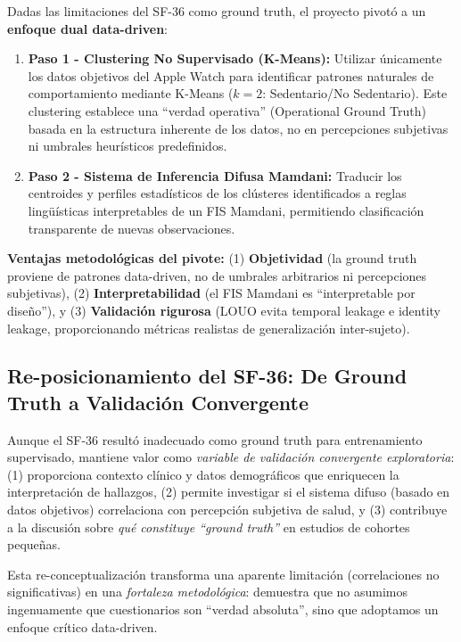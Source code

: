 Dadas las limitaciones del SF-36 como ground truth, el proyecto pivotó a un \textbf{enfoque dual data-driven}:

\begin{enumerate}
    \item \textbf{Paso 1 - Clustering No Supervisado (K-Means):} Utilizar únicamente los datos objetivos del Apple Watch para identificar patrones naturales de comportamiento mediante K-Means ($k=2$: Sedentario/No Sedentario). Este clustering establece una ``verdad operativa'' (Operational Ground Truth) basada en la estructura inherente de los datos, no en percepciones subjetivas ni umbrales heurísticos predefinidos.
    
    \item \textbf{Paso 2 - Sistema de Inferencia Difusa Mamdani:} Traducir los centroides y perfiles estadísticos de los clústeres identificados a reglas lingüísticas interpretables de un FIS Mamdani, permitiendo clasificación transparente de nuevas observaciones.
\end{enumerate}

\textbf{Ventajas metodológicas del pivote:} (1) \textbf{Objetividad} (la ground truth proviene de patrones data-driven, no de umbrales arbitrarios ni percepciones subjetivas), (2) \textbf{Interpretabilidad} (el FIS Mamdani es ``interpretable por diseño''), y (3) \textbf{Validación rigurosa} (LOUO evita temporal leakage e identity leakage, proporcionando métricas realistas de generalización inter-sujeto).

\subsection{Re-posicionamiento del SF-36: De Ground Truth a Validación Convergente}
\label{subsec:reposicionamiento_sf36}

Aunque el SF-36 resultó inadecuado como ground truth para entrenamiento supervisado, mantiene valor como \textit{variable de validación convergente exploratoria}: (1) proporciona contexto clínico y datos demográficos que enriquecen la interpretación de hallazgos, (2) permite investigar si el sistema difuso (basado en datos objetivos) correlaciona con percepción subjetiva de salud, y (3) contribuye a la discusión sobre \textit{qué constituye ``ground truth''} en estudios de cohortes pequeñas.

Esta re-conceptualización transforma una aparente limitación (correlaciones no significativas) en una \textit{fortaleza metodológica}: demuestra que no asumimos ingenuamente que cuestionarios son ``verdad absoluta'', sino que adoptamos un enfoque crítico data-driven.

